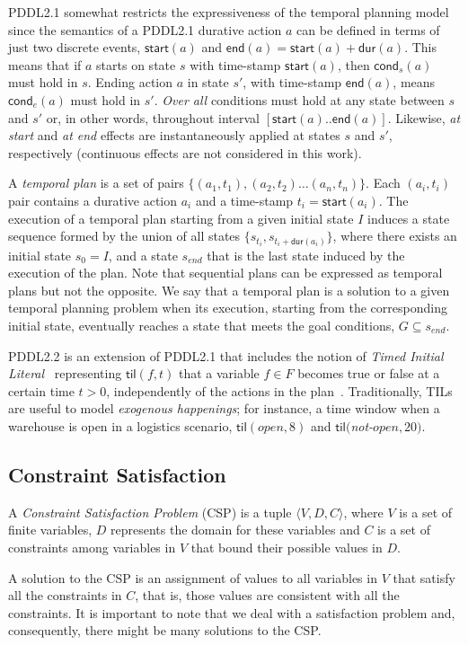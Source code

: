 \documentclass{ecai}
\newcommand{\tup}[1]{{\langle #1 \rangle}}
\newcommand{\cond}{\mathsf{cond}}  %
\newcommand{\dur}{\mathsf{dur}}    %
\newcommand{\start}{\mathsf{start}}%
\newcommand{\en}{\mathsf{end}}     %
\newcommand{\til}{\mathsf{til}}    %
\begin{document}
PDDL2.1 somewhat restricts the expressiveness of the temporal planning model since the semantics of a PDDL2.1 durative action $a$ can be defined in terms of just two discrete events, $\start(a)$ and $\en(a)=\start(a)+\dur(a)$. This means that if $a$ starts on state $s$ with time-stamp $\start(a)$, then $\cond_s(a)$ must hold in $s$. Ending action $a$ in state $s'$, with time-stamp $\en(a)$, means $\cond_e(a)$ must hold in $s'$. {\em Over all} conditions must hold at any state between $s$ and $s'$ or, in other words, throughout interval $[\start(a)..\en(a)]$. Likewise, {\em at start} and {\em at end} effects are instantaneously applied at states $s$ and $s'$, respectively (continuous effects are not considered in this work). 

A {\em temporal plan} is a set of pairs $\{(a_1,t_1),(a_2,t_2)\ldots (a_n,t_n)\}$. Each $(a_i,t_i)$ pair contains a durative action $a_i$ and a time-stamp $t_i=\start(a_i)$. The execution of a temporal plan starting from a given initial state $I$ induces a state sequence formed by the union of all states $\{s_{t_i}, s_{t_i+\dur(a_i)}\}$, where there exists an initial state $s_{0}=I$, and a state $s_{end}$ that is the last state induced by the execution of the plan. Note that sequential plans can be expressed as temporal plans but not the opposite. We say that a temporal plan is a solution to a given temporal planning problem when its execution, starting from the corresponding initial state, eventually reaches a state that meets the goal conditions, $G\subseteq s_{end}$.

PDDL2.2 is an extension of PDDL2.1 that includes the notion of {\em Timed Initial Literal}~\cite{hoffmann2005} representing $\til(f,t)$ that a variable $f\in F$ becomes true or false at a certain time $t>0$, independently of the actions in the plan~\cite{Edelkamp04}. Traditionally, TILs are useful to model {\em exogenous happenings}; for instance, a time window when a warehouse is open in a logistics scenario, $\til(open,8)$ and $\til($\textit{not-}$open,20)$.

\subsection{Constraint Satisfaction}
A {\em Constraint Satisfaction Problem} (CSP) is a tuple $\tup{V,D,C}$, where $V$ is a set of finite variables, $D$ represents the domain for these variables and $C$ is a set of constraints among variables in $V$ that bound their possible values in $D$.

A solution to the CSP is an assignment of values to all variables in $V$ that satisfy all the constraints in $C$, that is, those values are consistent with all the constraints. It is important to note that we deal with a satisfaction problem and, consequently, there might be many solutions to the CSP.
\end{document}
